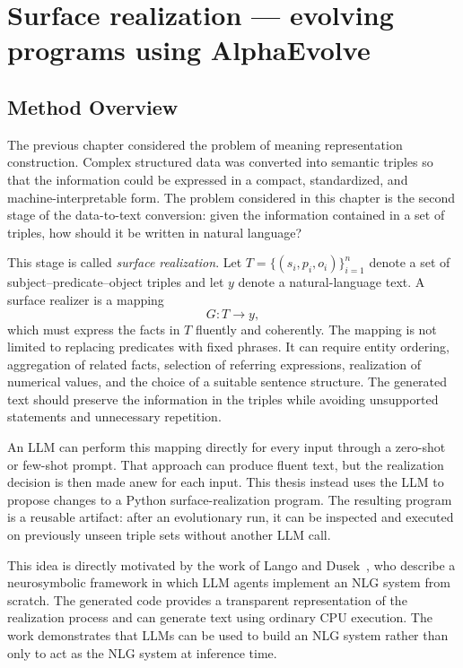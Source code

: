 \chapter{Surface realization --- evolving programs using AlphaEvolve}
\label{chap:surface-realization}

\section{Method Overview}
\label{sec:surface-method-overview}

The previous chapter considered the problem of meaning representation construction. Complex
structured data was converted into semantic triples so that the information
could be expressed in a compact, standardized, and machine-interpretable form.
The problem considered in this
chapter is the second stage of the data-to-text conversion: given the
information contained in a set of triples, how should it be written in natural
language?

This stage is called \emph{surface realization}. Let
$T = \{(s_i,p_i,o_i)\}_{i=1}^{n}$ denote a set of subject--predicate--object
triples and let $y$ denote a natural-language text. A surface realizer is a
mapping
\begin{equation}
    G : T \longrightarrow y,
\end{equation}
which must express the facts in $T$ fluently and coherently. The mapping is not
limited to replacing predicates with fixed phrases. It can require entity
ordering, aggregation of related facts, selection of referring expressions,
realization of numerical values, and the choice of a suitable sentence
structure. The generated text should preserve the information in the triples
while avoiding unsupported statements and unnecessary repetition.

An LLM can perform this mapping directly for every input through a zero-shot or
few-shot prompt. That approach can produce fluent text, but the realization decision is
then made anew for each input. This thesis instead uses the LLM to propose changes to a
Python surface-realization program. The resulting program is a reusable artifact:
after an evolutionary run, it can be inspected and executed on previously unseen
triple sets without another LLM call.

This idea is directly motivated by the work of Lango and Dusek~\cite{lango-dusek-2025-llm},
who describe a neurosymbolic framework in which LLM agents implement an NLG
system from scratch. The generated code provides a transparent
representation of the realization process and can generate text using ordinary
CPU execution. The work demonstrates that LLMs can be used to build an NLG
system rather than only to act as the NLG system at inference time.


